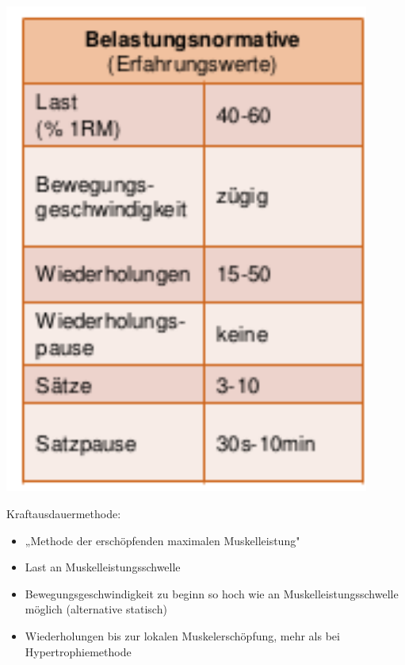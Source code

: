 \begin{minipage}{0.3\textwidth}
    \includegraphics[width=0.9\textwidth]{pictures/kraftausdauermethode}
\end{minipage}
\begin{minipage}{0.7\textwidth}
Kraftausdauermethode:
\begin{itemize}
    \item „Methode der erschöpfenden maximalen Muskelleistung"
    \item Last an Muskelleistungsschwelle
    \item Bewegungsgeschwindigkeit zu beginn so hoch wie an Muskelleistungsschwelle möglich (alternative statisch)
    \item Wiederholungen bis zur lokalen Muskelerschöpfung, mehr als bei Hypertrophiemethode
\end{itemize}
\end{minipage}


